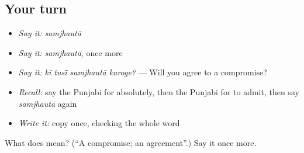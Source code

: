 \subsection*{Your turn}
\begin{itemize}
\raggedright
  \item \emph{Say it:} \emph{samjhautā}
  \item \emph{Say it:} \emph{samjhautā}, once more
  \item \emph{Say it:} \emph{kī tusī̃ samjhautā karoge?} — Will you agree to a compromise?
  \item \emph{Recall:} say the Punjabi for absolutely, then the Punjabi for to admit, then say \emph{samjhautā} again
  \item \emph{Write it:} copy \textbf{} once, checking the whole word
\end{itemize}

\begin{tcolorbox}[breakable,colback=teal!4,colframe=teal!35!black,title={Before you move on}]
What does  mean? (\textquotedblleft{}A compromise; an agreement\textquotedblright{}.) Say it once more.
\end{tcolorbox}
